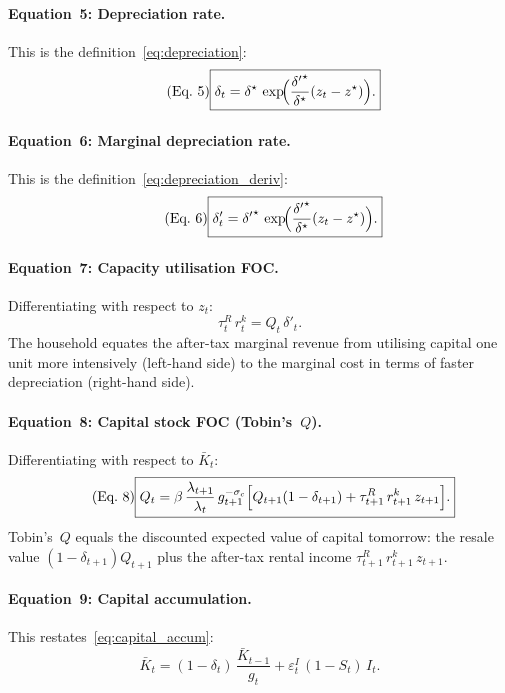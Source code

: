 \documentclass[11pt,a4paper]{article}
\newcommand{\bbar}[1]{\bar{#1}}
\begin{document}
\paragraph{Equation~5: Depreciation rate.}
This is the definition~\eqref{eq:depreciation}:
\begin{equation}\label{eq:eq5}\tag{Eq.~5}
  \boxed{
  \delta_t = \delta^{\star}\,
  \exp\!\Bigl(\frac{{\delta'}^{\star}}{\delta^{\star}}(z_t - z^{\star})\Bigr).}
\end{equation}

\paragraph{Equation~6: Marginal depreciation rate.}
This is the definition~\eqref{eq:depreciation_deriv}:
\begin{equation}\label{eq:eq6}\tag{Eq.~6}
  \boxed{
  \delta'_t = {\delta'}^{\star}\,
  \exp\!\Bigl(\frac{{\delta'}^{\star}}{\delta^{\star}}(z_t - z^{\star})\Bigr).}
\end{equation}

\paragraph{Equation~7: Capacity utilisation FOC.}
Differentiating with respect to $z_t$:
\begin{equation}\label{eq:eq7}\tag{Eq.~7}
  \boxed{\tau^R_t\,r^k_t = Q_t\,\delta'_t.}
\end{equation}
The household equates the after-tax marginal revenue from utilising capital
one unit more intensively (left-hand side) to the marginal cost in terms of
faster depreciation (right-hand side).

\paragraph{Equation~8: Capital stock FOC (Tobin's~$Q$).}
Differentiating with respect to $\bbar K_t$:
\begin{equation}\label{eq:eq8}\tag{Eq.~8}
  \boxed{
  Q_t = \beta\,\frac{\lambda_{t+1}}{\lambda_t}\,g_{t+1}^{-\sigma_c}
  \Bigl[Q_{t+1}(1-\delta_{t+1})
  + \tau^R_{t+1}\,r^k_{t+1}\,z_{t+1}\Bigr].}
\end{equation}
Tobin's~$Q$ equals the discounted expected value of capital tomorrow: the
resale value $(1-\delta_{t+1})Q_{t+1}$ plus the after-tax rental income
$\tau^R_{t+1}\,r^k_{t+1}\,z_{t+1}$.

\paragraph{Equation~9: Capital accumulation.}
This restates~\eqref{eq:capital_accum}:
\begin{equation}\label{eq:eq9}\tag{Eq.~9}
  \boxed{
  \bbar K_t = (1-\delta_t)\,\frac{\bbar K_{t-1}}{g_t}
  + \varepsilon^I_t\,(1-S_t)\,I_t.}
\end{equation}
\end{document}
